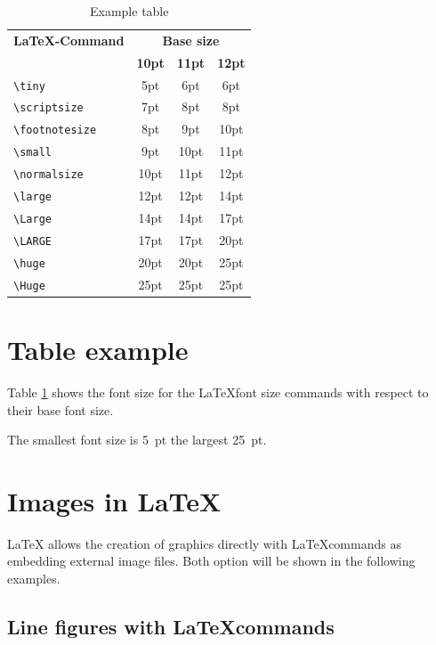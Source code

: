 \documentclass[11pt, a4paper]{article}
\newcommand{\ltx}{\LaTeX}
\begin{document}
\begin{table}[t]
\caption{Example table  \label{tab:Schriftgroessen}}
\centering
\begin{tabular}{lccc}
\toprule
\textbf{\ltx-Command} & \multicolumn{3}{c}{\textbf{Base size}}\\
\cline{2-4} & \textbf{10pt} & \textbf{11pt} & \textbf{12pt}\\
\midrule
\midrule
\verb+\tiny+			& 5pt & 6pt 	& 6pt\\
\verb+\scriptsize+		& 7pt & 8pt		& 8pt\\
\verb+\footnotesize+	& 8pt & 9pt		& 10pt\\
\verb+\small+			& 9pt & 10pt	& 11pt\\
\midrule
\midrule
\verb+\normalsize+		& 10pt	& 11pt	& 12pt\\
\midrule
\midrule
\verb+\large+			& 12pt	& 12pt	& 14pt\\
\verb+\Large+			& 14pt	& 14pt	& 17pt\\
\verb+\LARGE+			& 17pt	& 17pt	& 20pt\\
\verb+\huge+			& 20pt	& 20pt	& 25pt\\
\verb+\Huge+			& 25pt	& 25pt	& 25pt\\
\bottomrule
\end{tabular}
\end{table}%

\section{Table example}
Table \ref{tab:Schriftgroessen} shows the font size for the \ltx font size commands with respect to their base font size.

The smallest font size is 5~pt the largest 25~pt.

\section{Images in \ltx}
\ltx{} allows the creation of graphics directly with \ltx commands as embedding external image files. Both option will be shown in the following examples.

\subsection{Line figures with \ltx commands}
\end{document}
